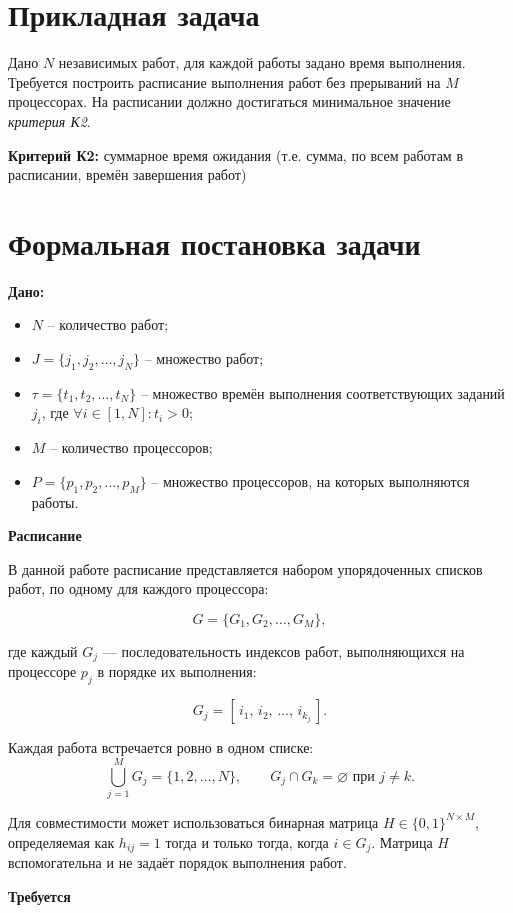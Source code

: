 \section*{Прикладная задача}
Дано $N$ независимых работ, для каждой работы задано время выполнения.
Требуется построить расписание выполнения работ без прерываний на $M$
процессорах. На расписании должно достигаться минимальное значение
\textit{критерия К2}.

\textbf{Критерий К2:} суммарное время ожидания (т.е. сумма, по всем работам в
расписании, времён завершения работ)
\section*{Формальная постановка задачи}
\textbf{Дано:}

\begin{itemize}
  \item $N$ – количество работ;
  \item $J = \{ j_1, j_2, \ldots, j_N \}$ – множество работ;
  \item $\tau = \{ t_1, t_2, \ldots, t_N \}$ – множество времён выполнения соответствующих заданий $j_i$, 
  где $\forall i \in [1, N]: t_i > 0$;
  \item $M$ – количество процессоров;
  \item $P = \{ p_1, p_2, \ldots, p_M \}$ – множество процессоров, на которых выполняются работы.
\end{itemize}

\textbf{Расписание}

В данной работе расписание представляется набором
упорядоченных списков работ, по одному для каждого процессора:

\[
G = \{ G_1, G_2, \ldots, G_M \},
\]

где каждый \(G_j\) — последовательность индексов работ, выполняющихся
на процессоре \(p_j\) в порядке их выполнения:

\[
G_j = [\, i_1,\, i_2,\, \ldots,\, i_{k_j} \,].
\]

Каждая работа встречается ровно в одном списке:
\[
\bigcup_{j=1}^{M} G_j = \{1,2,\ldots,N\}, \qquad
G_j \cap G_k = \varnothing \text{ при } j \neq k.
\]

Для совместимости может использоваться бинарная матрица
\(H \in \{0,1\}^{N\times M}\), определяемая как
\(h_{ij}=1\) тогда и только тогда, когда \(i \in G_j\).
Матрица \(H\) вспомогательна и не задаёт порядок выполнения работ.


\textbf{Требуется}

